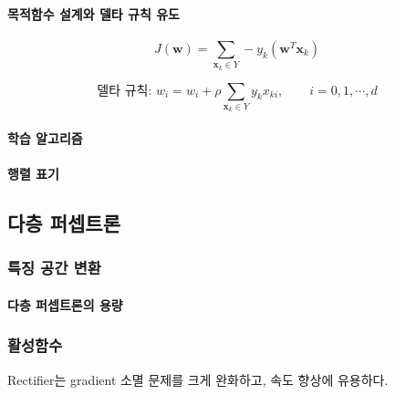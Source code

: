 \documentclass [12pt] {oblivoir}
\let\oldsubsubsection=\subsubsection
\renewcommand{\subsubsection}
{
  \filbreak
  \oldsubsubsection
}
\begin{document}
\paragraph*{목적함수 설계와 델타 규칙 유도}\mbox{}

\begin{equation} \tag{3.7}
  J(\mathbf{w}) = \sum_{\mathbf{x}_{k} \in Y} -y_{k}(\mathbf{w}^{T}\mathbf{x}_{k})
\end{equation}

\begin{equation} \tag{3.9}
  \text{델타 규칙: } w_{i} = w_{i} + \rho\sum_{\mathbf{x}_{k} \in Y}y_{k}x_{ki}, \qquad i = 0, 1, \cdots, d
\end{equation}

\vspace{3mm}

\paragraph*{학습 알고리즘}\mbox{}

\vspace{3mm}

\paragraph*{행렬 표기}\mbox{}

\vspace{3mm}

\subsection{다층 퍼셉트론}

\subsubsection{특징 공간 변환}

\paragraph*{다층 퍼셉트론의 용량}\mbox{}

\vspace{3mm}

\subsubsection{활성함수}

Rectifier는 gradient 소멸 문제를 크게 완화하고, 속도 향상에 유용하다.
\end{document}
